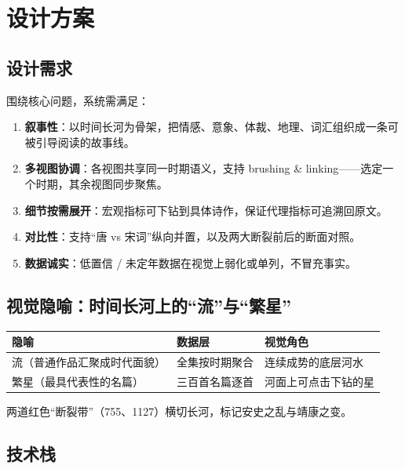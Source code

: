 \section{设计方案}

\subsection{设计需求}

围绕核心问题，系统需满足：

\begin{enumerate}[label=\textbf{\arabic*.}, leftmargin=*, itemsep=0.25em]
    \item \textbf{叙事性}：以时间长河为骨架，把情感、意象、体裁、地理、词汇组织成一条可被引导阅读的故事线。
    \item \textbf{多视图协调}：各视图共享同一时期语义，支持 brushing \& linking——选定一个时期，其余视图同步聚焦。
    \item \textbf{细节按需展开}：宏观指标可下钻到具体诗作，保证代理指标可追溯回原文。
    \item \textbf{对比性}：支持“唐 vs 宋词”纵向并置，以及两大断裂前后的断面对照。
    \item \textbf{数据诚实}：低置信 / 未定年数据在视觉上弱化或单列，不冒充事实。
\end{enumerate}

\subsection{视觉隐喻：时间长河上的“流”与“繁星”}

\begin{table}[H]
\centering
\renewcommand{\arraystretch}{1.3}
\begin{tabular}{l l l}
\toprule
隐喻 & 数据层 & 视觉角色 \\
\midrule
流（普通作品汇聚成时代面貌） & 全集按时期聚合 & 连续成势的底层河水 \\
繁星（最具代表性的名篇） & 三百首名篇逐首 & 河面上可点击下钻的星 \\
\bottomrule
\end{tabular}
\end{table}

\noindent 两道红色“断裂带”（755、1127）横切长河，标记安史之乱与靖康之变。

\subsection{技术栈}


